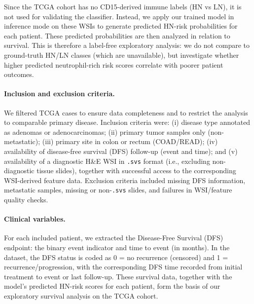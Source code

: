 
Since the TCGA cohort has no CD15-derived immune labels (HN vs LN), it is not used for validating the classifier. Instead, we apply our trained model in inference mode on these WSIs to generate predicted HN-risk probabilities for each patient. These predicted probabilities are then analyzed in relation to survival. This is therefore a label-free exploratory analysis: we do not compare to ground-truth HN/LN classes (which are unavailable), but investigate whether higher predicted neutrophil-rich risk scores correlate with poorer patient outcomes.

\paragraph{Inclusion and exclusion criteria.} We filtered TCGA cases to ensure data completeness and to restrict the analysis to comparable primary disease. Inclusion criteria were: (i) disease type annotated as adenomas or adenocarcinomas; (ii) primary tumor samples only (non-metastatic); (iii) primary site in colon or rectum (COAD/READ); (iv) availability of disease-free survival (DFS) follow-up (event and time); and (v) availability of a diagnostic H\&E WSI in \texttt{.svs} format (i.e., excluding non-diagnostic tissue slides), together with successful access to the corresponding WSI-derived feature data. Exclusion criteria included missing DFS information, metastatic samples, missing or non-\texttt{.svs} slides, and failures in WSI/feature quality checks.

\paragraph{Clinical variables.} For each included patient, we extracted the Disease-Free Survival (DFS) endpoint: the binary event indicator and time to event (in months). In the dataset, the DFS status is coded as 0 = no recurrence (censored) and 1 = recurrence/progression, with the corresponding DFS time recorded from initial treatment to event or last follow-up. These survival data, together with the model’s predicted HN-risk scores for each patient, form the basis of our exploratory survival analysis on the TCGA cohort.